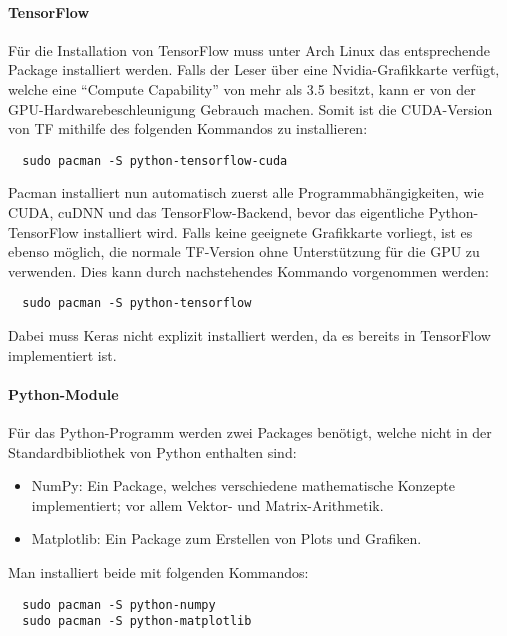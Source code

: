 \paragraph{TensorFlow}
Für die Installation von TensorFlow muss unter Arch Linux das entsprechende
Package installiert werden.
Falls der Leser über eine Nvidia-Grafikkarte verfügt, welche eine ``Compute
Capability'' von mehr als 3.5 besitzt, kann er von der
GPU-Hardwarebeschleunigung Gebrauch machen.
Somit ist die CUDA-Version von TF mithilfe des folgenden Kommandos zu installieren:
\begin{verbatim}
  sudo pacman -S python-tensorflow-cuda
\end{verbatim}
Pacman installiert nun automatisch zuerst alle Programmabhängigkeiten, wie
CUDA, cuDNN und das TensorFlow-Backend, bevor das eigentliche
Python-TensorFlow installiert wird.
\para{}
Falls keine geeignete Grafikkarte vorliegt, ist es ebenso möglich, die normale
TF-Version ohne Unterstützung für die GPU zu verwenden.
Dies kann durch nachstehendes Kommando vorgenommen werden:
\begin{verbatim}
  sudo pacman -S python-tensorflow
\end{verbatim}
\para{}
Dabei muss Keras nicht explizit installiert werden, da es bereits in TensorFlow implementiert ist.

\paragraph{Python-Module}

Für das Python-Programm werden zwei Packages benötigt, welche
nicht in der Standardbibliothek von Python enthalten sind:
\begin{itemize}
\item{NumPy: Ein Package, welches verschiedene mathematische Konzepte
    implementiert; vor allem Vektor- und Matrix-Arithmetik.}
\item{Matplotlib: Ein Package zum Erstellen von Plots und Grafiken.}
\end{itemize}

Man installiert beide mit folgenden Kommandos:
\begin{verbatim}
  sudo pacman -S python-numpy
  sudo pacman -S python-matplotlib
\end{verbatim}


